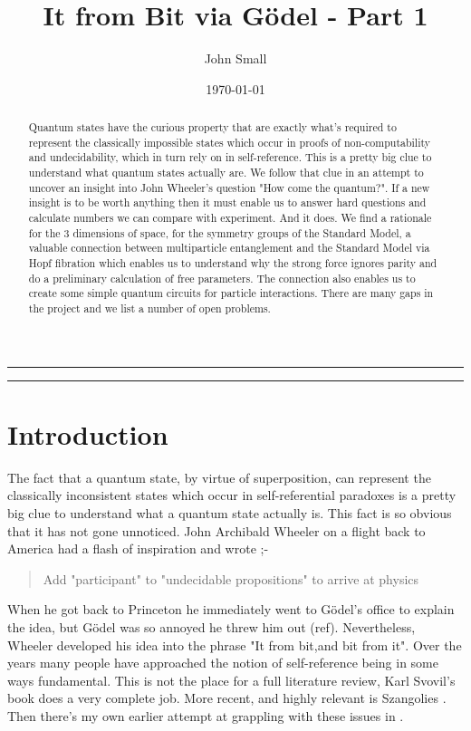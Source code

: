 \documentclass{article}
\title{It from Bit via G\"odel - Part 1}
\author{ John Small}
\date{\today}
\begin{document}
\maketitle

\medskip

\noindent\rule{\textwidth}{0.4pt}
\begin{abstract}
  Quantum states have the curious property that are exactly what's required to represent the classically impossible states which occur in proofs of non-computability and undecidability, which in turn rely on in self-reference. This is a pretty big clue to understand what quantum states actually are. We follow that clue in an attempt to uncover an insight into John Wheeler's question "How come the quantum?". If a new insight is to be worth anything then it must enable us to answer hard questions and calculate numbers we can compare with experiment. And it does. We find a rationale for the 3 dimensions of space, for the symmetry groups of the Standard Model, a valuable connection between multiparticle entanglement and the Standard Model via Hopf fibration which enables us to  understand why the strong force ignores parity and do a preliminary calculation of free parameters. The connection also enables us to create some simple quantum circuits for particle interactions. There are many gaps in the project and we list a number of open problems.
\end{abstract}
\noindent\rule{\textwidth}{0.4pt}

\section{Introduction}
The fact that a quantum state, by virtue of superposition, can represent the classically inconsistent states which occur in self-referential paradoxes is a pretty big clue to understand what a quantum state actually is. This fact is so obvious that it has not gone unnoticed. John Archibald Wheeler on a flight back to America had a flash of inspiration and wrote ;-
\begin{quotation}
  Add "participant" to "undecidable propositions" to arrive at physics
  \par
  \hfill \autocite{wheeler_j_1974}
\end{quotation}
When he got back to Princeton he immediately went to G\"odel's office to explain the idea, but G\"odel was so annoyed he threw him out (ref). Nevertheless, Wheeler developed his idea into the phrase "It from bit,and bit from it". Over the years many people have approached the notion of self-reference being in some ways fundamental. This is not the place for a full literature review, Karl Svovil's book  does a very complete job. More recent, and highly relevant is Szangolies \autocite{szangolies_2020}. Then there's my own earlier attempt at grappling with these issues in \autocite{small_2006}.
\end{document}
